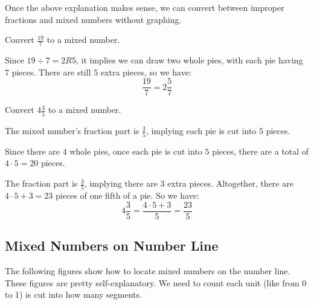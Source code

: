 Once the above explanation makes sense, we can convert between improper fractions and mixed numbers without graphing.

\begin{myexample}
Convert $\frac{19}{7}$ to a mixed number.
\end{myexample}
\begin{solution}
Since $19\div7=2R5$, it implies we can draw two whole pies, with each pie having $7$ pieces. There are still $5$ extra pieces, so we have:
\[ \frac{19}{7} = 2\frac{5}{7} \]
\end{solution}

\begin{myexample}
Convert $4\frac{3}{5}$ to a mixed number.
\end{myexample}
\begin{solution}
The mixed number's fraction part is $\frac{3}{5}$, implying each pie is cut into $5$ pieces.

Since there are $4$ whole pies, once each pie is cut into $5$ pieces, there are a total of $4\cdot5=20$ pieces.

The fraction part is $\frac{3}{5}$, implying there are $3$ extra pieces. Altogether, there are $4\cdot5+3=23$ pieces of one fifth of a pie. So we have: 
\[ 4\frac{3}{5} = \frac{4\cdot5+3}{5} = \frac{23}{5} \]
\end{solution}

\subsection{Mixed Numbers on Number Line}
The following figures show how to locate mixed numbers on the number line. These figures are pretty self-explanatory. We need to count each unit (like from 0 to 1) is cut into how many segments.

